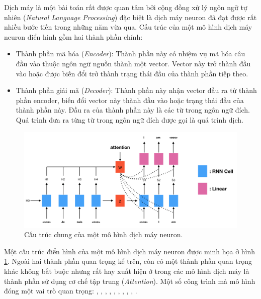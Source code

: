 \documentclass[14pt, a4paper]{article}
\numberwithin{equation}{section}
\numberwithin{algorithm}{section}
\numberwithin{figure}{section}
\numberwithin{dl}{section}
\numberwithin{md}{section}
\numberwithin{bd}{section}
\numberwithin{dn}{section}
\numberwithin{hq}{section}
\begin{document}
    Dịch máy là một bài toán rất được quan tâm bởi cộng đồng xử lý ngôn ngữ tự nhiên (\textit{Natural Language Processing}) đặc biệt là dịch máy neuron đã đạt được rất nhiều bước tiến trong những năm vừa qua.
    Cấu trúc của một mô hình dịch máy neuron điển hình gồm hai thành phần chính:

    \begin{itemize}
        \item Thành phần mã hóa (\textit{Encoder}): Thành phần này có nhiệm vụ mã hóa câu đầu vào thuộc ngôn ngữ nguồn thành một vector. Vector này trở thành đầu vào hoặc được biến đổi trở thành trạng thái đầu của thành phần tiếp theo.
        \item Thành phần giải mã (\textit{Decoder}): Thành phần này nhận vector đầu ra từ thành phần encoder, biến đổi vector này thành đầu vào hoặc trạng thái đầu của thành phần này. Đầu ra của thành phần này là các từ trong ngôn ngữ đích. Quá trình đưa ra từng từ trong ngôn ngữ đích được gọi là quá trình dịch.
    \end{itemize}

    \begin{figure}[h!] \centering

        \includegraphics[scale=0.35]{Neural_Machine_Translation_Architecture.png}
        \caption{Cấu trúc chung của một mô hình dịch máy neuron.}
    
        \label{fig:Neural_Machine_Translation_Architecture}
    \end{figure}

    Một cấu trúc điển hình của một mô hình dịch máy neuron được minh họa ở hình \ref{fig:Neural_Machine_Translation_Architecture}.
    Ngoài hai thành phần quan trọng kể trên, còn có một thành phần quan trọng khác không bắt buộc nhưng rất hay xuất hiện ở trong các mô hình dịch máy là thành phần sử dụng cơ chế tập trung (\textit{Attention}).
    Một số công trình mà mô hình đóng một vai trò quan trọng: \cite{bahdanau2014neural}, \cite{luong2014addressing}, \cite{jean2014using}, \cite{luong2015effective}, \cite{tang2016neural}, \cite{wang2016memory}, \cite{li2016towards}, \cite{tu2016modeling}, \cite{shen2015minimum}, \cite{zhou2016deep}.
\end{document}
